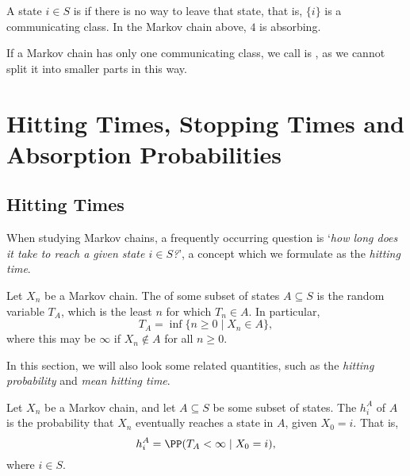\documentclass[a4paper]{scrartcl}
\begin{document}
A state $i \in S$ is  if there is no way to leave that state, that is, $\{i\}$ is a communicating class. In the Markov chain above, $4$ is absorbing.

If a Markov chain has only one communicating class, we call is , as we cannot split it into smaller parts in this way.





\section{Hitting Times, Stopping Times and Absorption Probabilities}

\subsection{Hitting Times}

When studying Markov chains, a frequently occurring question is `\emph{how long does it take to reach a given state $i \in S$?}', a concept which we formulate as the \emph{hitting time}.

\begin{definition}
	Let $X_n$ be a Markov chain.
	The  of some subset of states $A \subseteq S$ is the random variable $T_A$, which is the least $n$ for which $T_n \in A$. 
	In particular,
	$$
	T_A = \inf\{n \geq 0 \mid X_n \in A\},
	$$
	where this may be $\infty$ if $X_n \not \in A$ for all $n \geq 0$.
\end{definition}

In this section, we will also look some related quantities, such as the \emph{hitting probability} and \emph{mean hitting time}.

\begin{definition}
	Let $X_n$ be a Markov chain, and let $A \subseteq S$ be some subset of states.
	The  $h^A_i$ of $A$ is the probability that $X_n$ eventually reaches a state in $A$, given $X_0 = i$. That is,
	$$
	h^A_i = \PP(T_A < \infty \mid X_0 = i),
	$$
	where $i \in S$.
\end{definition}
\end{document}
